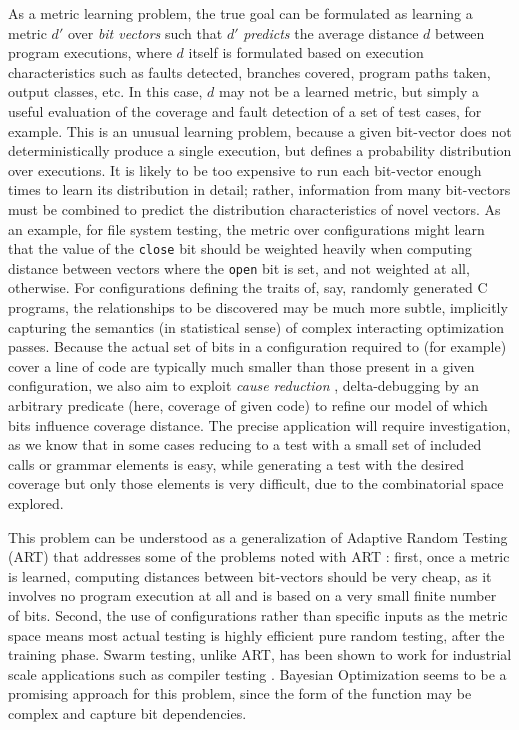 As a metric learning problem, the true goal can be formulated as
learning a metric $d'$ over \emph{bit vectors} such that $d'$
\emph{predicts} the average distance $d$ between program executions,
where $d$ itself is formulated based on execution characteristics such
as faults detected, branches covered, program paths taken, output
classes, etc.  In this case, $d$ may not be a learned metric, but
simply a useful evaluation of the coverage and fault detection of a
set of test cases, for example.  This is an unusual learning problem,
because a given bit-vector does not deterministically produce a single
execution, but defines a probability distribution over executions.  It
is likely to be too expensive to run each bit-vector enough times to
learn its distribution in detail; rather, information from many
bit-vectors must be combined to predict the distribution
characteristics of novel vectors.  As an example, for file system
testing, the metric over configurations might learn that the value of
the {\tt close} bit should be weighted heavily when computing distance
between vectors where the {\tt open} bit is set, and not weighted at
all, otherwise.  For configurations defining the traits of, say,
randomly generated C programs, the relationships to be discovered may
be much more subtle, implicitly capturing the semantics (in
statistical sense) of complex interacting optimization passes.
Because the actual set of bits in a configuration required to (for
example) cover a line of code are typically much smaller than those
present in a given configuration, we also aim to exploit \emph{cause
reduction} \cite{icst2014}, delta-debugging by an arbitrary predicate
(here, coverage of given code) to refine our model of which bits
influence coverage distance.  The precise application will require
investigation, as we know that in some cases reducing to a test with a
small set of included calls or grammar elements is easy, while
generating a test with the desired coverage but only those elements is
very difficult, due to the combinatorial space explored.

This problem can be understood as a generalization of Adaptive Random
Testing (ART) \cite{ARTChen} that addresses some of the problems noted
with ART \cite{ISSTAART}: first, once a metric is learned, computing
distances between bit-vectors should be very cheap, as it involves no
program execution at all and is based on a very small finite number of
bits.  Second, the use of configurations rather than specific inputs
as the metric space means most actual testing is highly efficient pure
random testing, after the training phase.  Swarm testing, unlike ART,
has been shown to work for industrial scale applications such as
compiler testing \cite{ISSTA12,icst2014}.  Bayesian Optimization seems
to be a promising approach for this problem, since the form of the
function may be complex and capture bit dependencies.

